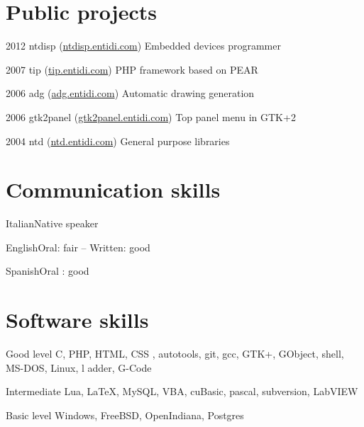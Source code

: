 \documentclass{bscv}
\begin{document}
\section{Public projects}

\begin{yearlist}

\item{2012}
     {ntdisp (\href{http://ntdisp.entidi.com/}{ntdisp.entidi.com})}
     {Embedded devices programmer}

\item{2007}
     {tip (\href{http://tip.entidi.com/}{tip.entidi.com})}
     {PHP framework based on PEAR}

\item{2006}
     {adg (\href{http://adg.entidi.com/}{adg.entidi.com})}
     {Automatic drawing generation}

\item{2006}
     {gtk2panel (\href{http://gtk2panel.entidi.com/}{gtk2panel.entidi.com})}
     {Top panel menu in GTK+2}

\item{2004 }
     {ntd (\href{http://ntd.entidi.com/}{ntd.entidi.com})}
     {General purpose libraries}

\end{yearlist}

\section{Communication skills}

\begin{factlist}
\item{Italian}{Native speaker}
\item{English}{Oral: fair -- Written: good}
\item{Spanish}{Oral : good}
\end{factlist}

\section{Software  skills}

\begin{factlist}

\item{Good level}
     {C, PHP, HTML, CSS , autotools, git, gcc, GTK+, GObject, shell,
      MS-DOS, Linux, l adder, G-Code}

\item{Intermediate}
     {Lua, \LaTeX,  MySQL, VBA, cuBasic, pascal, subversion, LabVIEW}

\item{Basic level}
     {Windows, FreeBSD, OpenIndiana, Postgres}
\end{factlist}
\end{document}
